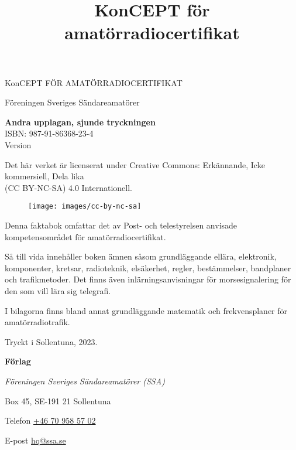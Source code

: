 \onecolumn{}
\vspace{10em}
\title{KonCEPT för amatörradiocertifikat}
\begin{center}
\Large{KonCEPT FÖR AMATÖRRADIOCERTIFIKAT}

Föreningen Sveriges Sändareamatörer\\[2\baselineskip]
\end{center}

\noindent \textbf{Andra upplagan, sjunde tryckningen}\\
\noindent ISBN: 987-91-86368-23-4\\
\noindent Version \revision
\bigskip

\noindent Det här verket är licenserat under Creative Commons:\newline
\noindent Erkännande, Icke kommersiell, Dela lika\\
\noindent (CC BY-NC-SA) 4.0 Internationell.
\begin{figure}[h]
    \texttt{[image: images/cc-by-nc-sa]}
\end{figure}

\vfill

\noindent Denna faktabok omfattar det av Post- och tele\-styrel\-sen anvisade
kompetensområdet för amatörradiocertifikat.

\bigskip

\noindent Så till vida innehåller boken ämnen såsom grundläggande ellära, elektronik, komponenter,
kretsar, radioteknik, elsäkerhet, regler, bestämmelser, bandplaner och tra\-fik\-metoder.
Det finns även inlärningsanvisningar för morsesignalering för den
som vill lära sig telegrafi.

\bigskip

\noindent I bilagorna finns bland annat grundläggande matematik
och frekvensplaner för ama\-törradiotrafik. 

\vfill

\noindent Tryckt i Sollentuna, 2023.

\bigskip

\noindent \textbf{Förlag}

\smallskip

\noindent\textit{Föreningen Sveriges Sändareamatörer (SSA)}

\smallskip\noindent Box 45, SE-191 21 Sollentuna

\smallskip\noindent Telefon \href{tel:+46709585702}{+46 70 958 57 02}

\smallskip\noindent E-post \href{mailto:hq@ssa.se}{hq@ssa.se}

\restoregeometry\twocolumn
{}
